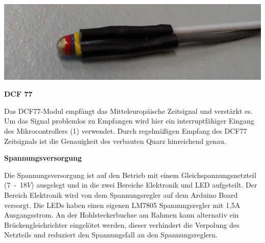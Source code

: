 \begin{multicols}{2}
{}

{
\centering
\includegraphics[width=0.9\columnwidth]{Abbildungen/Elektronik/NTC} 

}


\textbf{DCF 77}

Das DCF77-Modul empfängt das Mitteleuropäische Zeitsignal und verstärkt es. Um das Signal problemlos zu Empfangen wird hier ein interruptfähiger Eingang des Mikrocontrollers (1) verwendet. Durch regelmäßigen Empfang des DCF77 Zeitsignals ist die Genauigkeit des verbauten Quarz hinreichend genau.


\textbf{Spannungsversorgung}

Die Spannungsversorgung ist auf den Betrieb mit einem Gleichspannungsnetzteil (7~-~18$V$) ausgelegt und in die zwei Bereiche Elektronik und LED aufgeteilt. Der Bereich Elektronik wird von dem Spannungsregler auf dem Arduino Board versorgt. Die LEDs haben einen eigenen LM7805 Spannungsregler mit 1,5A Ausgangsstrom. An der Hohlsteckerbuchse am Rahmen kann alternativ ein Brückengleichrichter eingelötet werden, dieser verhindert die Verpolung des Netzteils und reduziert den Spannungsfall an den Spannungsreglern.
\end{multicols}

